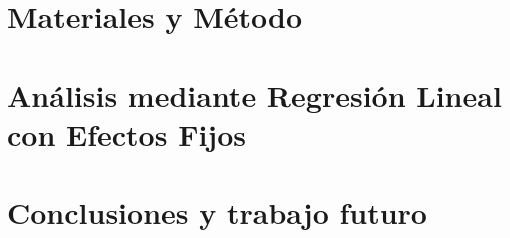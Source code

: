 \documentclass[runningheads,a4paper]{llncs}
\begin{document}


\section{Materiales y Método}


\section{Análisis mediante Regresión Lineal con Efectos Fijos}


\section{Conclusiones y trabajo futuro}







\end{document}
